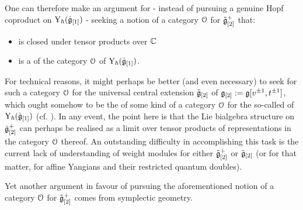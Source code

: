             One can therefore make an argument for - instead of pursuing a genuine Hopf coproduct on $\mathrm{Y}_{\hbar}(\hat{\mathfrak{g}}_{[1]})$ - seeking a notion of a category $\mathcal{O}$ for $\tilde{\mathfrak{g}}_{[2]}^+$ that:
            \begin{itemize}
                \item is closed under tensor products over $\mathbb{C}$
                \item is a  of the category $\mathcal{O}$ of $\mathrm{Y}_{\hbar}(\hat{\mathfrak{g}}_{[1]})$.
            \end{itemize}
            For technical reasons, it might perhaps be better (and even necessary) to seek for such a category $\mathcal{O}$ for the universal central extension $\tilde{\mathfrak{g}}_{[2]}$ of $\mathfrak{g}_{[2]} := \mathfrak{g}[v^{\pm 1}, t^{\pm 1}]$, which ought somehow to be the  of some kind of a category $\mathcal{O}$ for the so-called  of $\mathrm{Y}_{\hbar}(\hat{\mathfrak{g}}_{[1]})$ (cf. \cite{wendlandt_restricted_quantum_doubles_of_yangians}). In any event, the point here is that the Lie bialgebra structure on $\tilde{\mathfrak{g}}_{[2]}^+$ can perhaps be realised as a limit over tensor products of representations in the category $\mathcal{O}$ thereof. An outstanding difficulty in accomplishing this task is the current lack of understanding of weight modules for either $\tilde{\mathfrak{g}}_{[2]}^+$ or $\tilde{\mathfrak{g}}_{[2]}$ (or for that matter, for affine Yangians and their restricted quantum doubles).

            Yet another argument in favour of pursuing the aforementioned notion of a category $\mathcal{O}$ for $\tilde{\mathfrak{g}}_{[2]}^+$ comes from symplectic geometry. 

    

    

            
    \printbibliography

